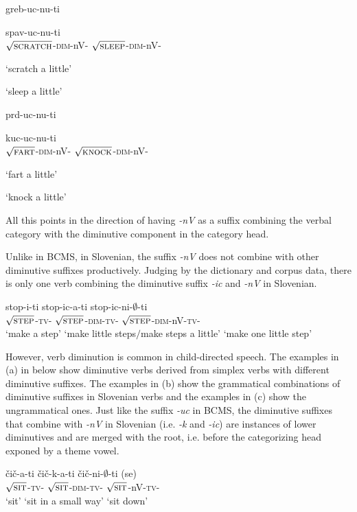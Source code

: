 \documentclass[output=paper,colorlinks,citecolor=brown]{langscibook}
\begin{document}
\ea\label{str:ex:doub}
  \gll \parbox{4cm}{greb-uc-nu-ti} spav-uc-nu-ti\\
  $\sqrt{\textsc{scratch}}$-\textsc{dim}-nV-{\INF} $\sqrt{\textsc{sleep}}$-\textsc{dim}-nV-{\INF}\\  
  \glt \parbox{4cm}{`scratch a little'} `sleep a little'\smallskip
   
  \gll \parbox{4cm}{prd-uc-nu-ti}  kuc-uc-nu-ti\\
  $\sqrt{\textsc{fart}}$-\textsc{dim}-nV-{\INF} 
  {} 
  $\sqrt{\textsc{knock}}$-\textsc{dim}-nV-{\INF}\\
  \glt \parbox{4cm}{`fart a little'} `knock a little'

\z

\noindent All this points in the direction of having \textit{-nV} as a suffix combining the verbal category with the diminutive component in the category head.

Unlike in BCMS, in Slovenian, the suffix \textit{-nV} does not combine with other diminutive suffixes productively. Judging by the dictionary and corpus data, there is only one verb combining the diminutive suffix \textit{-ic} and \textit{-nV} in Slovenian.

\ea\label{str:ex:doub1}

\gll stop-i-ti	stop-ic-a-ti	stop-ic-ni-$∅$-ti \\
$\sqrt{\textsc{step}}$-\textsc{tv}-{\INF} $\sqrt{\textsc{step}}$-\textsc{dim}-\textsc{tv}-{\INF} $\sqrt{\textsc{step}}$-\textsc{dim}-nV-\textsc{tv}-{\INF}\\ 
\glt `make a step' `make little steps$/$make steps a little' `make one little step'

\z

\noindent However, verb diminution is common in child-directed speech. The examples in (a) in  below show diminutive verbs derived from simplex verbs with different diminutive suffixes. The examples in (b) show the grammatical combinations of diminutive suffixes in Slovenian verbs and the examples in (c) show the ungrammatical ones. Just like the suffix \textit{-uc} in BCMS, the diminutive suffixes that combine with \textit{-nV} in Slovenian (i.e. \textit{-k} and \textit{-ic}) are instances of lower diminutives and are merged with the root, i.e. before the categorizing head exponed by a theme vowel.

\ea\label{str:ex:chld}
\ea \gll čič-a-ti	čič-k-a-ti	čič-ni-$∅$-ti (se)\\
$\sqrt{\textsc{sit}}$-\textsc{tv}-{\INF} $\sqrt{\textsc{sit}}$-\textsc{dim}-\textsc{tv}-{\INF} $\sqrt{\textsc{sit}}$-nV-\textsc{tv}-{\INF} {\REFL}\\ 
\glt `sit' `sit in a small way' `sit down' \label{str:ex:chld-a}
\end{document}
